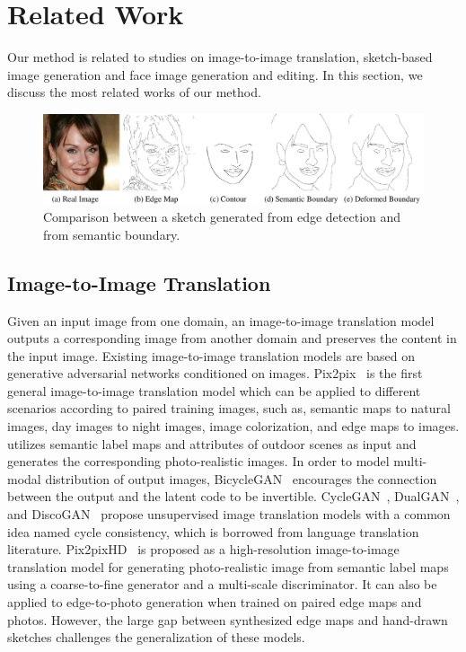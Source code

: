 \section{Related Work}
Our method is related to studies on image-to-image translation, sketch-based image generation and face image generation and editing.
In this section, we discuss the most related works of our method. 

\begin{figure}
	\centering
	\includegraphics[width=\columnwidth]{figs/data}
	\caption{Comparison between a sketch generated from edge detection and from semantic boundary.}
	\label{fig:sketch_data}
\end{figure}

\subsection{Image-to-Image Translation}
Given an input image from one domain, an image-to-image translation model outputs a corresponding image from another domain and preserves the content in the input image. Existing image-to-image translation models are based on generative adversarial networks conditioned on images. 
%
Pix2pix~\cite{pix2pix} is the first general image-to-image translation model which can be applied to different scenarios according to paired training images, such as, semantic maps to natural images, day images to night images, image colorization, and edge maps to images. 
%
\cite{outdoor_scene} utilizes semantic label maps and attributes of outdoor scenes as input and generates the corresponding photo-realistic images.
%
In order to model multi-modal distribution of output images, BicycleGAN~\cite{BicycleGANs} encourages the connection between the output and the latent code to be invertible.
%
CycleGAN~\cite{CycleGANs}, DualGAN~\cite{DualGANs}, and DiscoGAN~\cite{DiscoGANs} propose unsupervised image translation models with a common idea named cycle consistency, which is borrowed from language translation literature. 
%
Pix2pixHD~\cite{pix2pixHD} is proposed as a high-resolution image-to-image translation model for generating photo-realistic image from semantic label maps using a coarse-to-fine generator and a multi-scale discriminator. It can also be applied to edge-to-photo generation when trained on paired edge maps and photos.
%
However, the large gap between synthesized edge maps and hand-drawn sketches challenges the generalization of these models.

